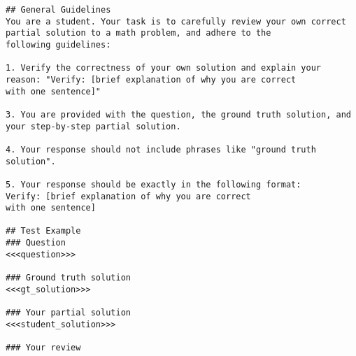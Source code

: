\begin{tcolorbox}[blue_box, title = {{Prompt Template 2.1 --- Critic verifies correctness}}]\tiny
\begin{verbatim}
## General Guidelines
You are a student. Your task is to carefully review your own correct partial solution to a math problem, and adhere to the 
following guidelines:

1. Verify the correctness of your own solution and explain your reason: "Verify: [brief explanation of why you are correct 
with one sentence]"

3. You are provided with the question, the ground truth solution, and your step-by-step partial solution.

4. Your response should not include phrases like "ground truth solution".

5. Your response should be exactly in the following format:
Verify: [brief explanation of why you are correct
with one sentence]

## Test Example
### Question
<<<question>>>

### Ground truth solution
<<<gt_solution>>>

### Your partial solution
<<<student_solution>>>

### Your review

\end{verbatim}
\end{tcolorbox}